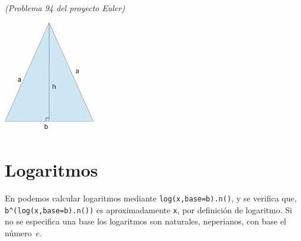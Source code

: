 \begin{ejer}	{\itshape (Problema 94 del proyecto Euler)}
\begin{enumerate}
	\centerline{\includegraphics[height=140pt]{imagenes/triangle.png}}
	
	\end{enumerate}

\end{ejer}










\section{Logaritmos}\label{log}

En {\sage} podemos calcular logaritmos mediante \lstinline|log(x,base=b).n()|, y
se verifica que, \lstinline|b^(log(x,base=b).n())| es
aproximadamente {\tt x}, por definici\'on de logaritmo. Si no se especifica una
base los logaritmos son
naturales, neperianos, con base el n\'umero~$e$.


